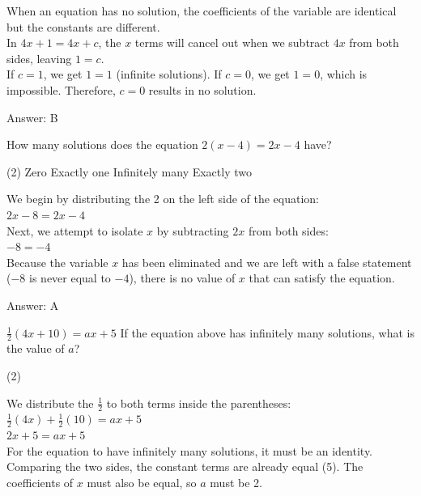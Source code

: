 \documentclass[11pt,paper=a4,answers]{exam}
\begin{document}
\begin{questions}
\begin{solution}
When an equation has no solution, the coefficients of the variable are identical but the constants are different. 
\\[10pt]
In $4x + 1 = 4x + c$, the $x$ terms will cancel out when we subtract $4x$ from both sides, leaving $1 = c$. 
\\[10pt]
If $c = 1$, we get $1 = 1$ (infinite solutions). If $c = 0$, we get $1 = 0$, which is impossible. Therefore, $c = 0$ results in no solution.

\vspace{20pt}
Answer: \colorbox{yellow!100}{B}
\end{solution}

\question
How many solutions does the equation $2(x - 4) = 2x - 4$ have?
\begin{tasks}(2)
    \task Zero
    \task Exactly one
    \task Infinitely many
    \task Exactly two
\end{tasks}

\begin{solution}
We begin by distributing the 2 on the left side of the equation:
\\[10pt]
$2x - 8 = 2x - 4$ 
\\[10pt]
Next, we attempt to isolate $x$ by subtracting $2x$ from both sides:
\\[10pt]
$-8 = -4$ 
\\[10pt]
Because the variable $x$ has been eliminated and we are left with a false statement ($-8$ is never equal to $-4$), there is no value of $x$ that can satisfy the equation.

\vspace{20pt}
Answer: \colorbox{yellow!100}{A}
\end{solution}

\question
$\frac{1}{2}(4x + 10) = ax + 5$
If the equation above has infinitely many solutions, what is the value of $a$?
\begin{tasks}(2)
\end{tasks}

\begin{solution}
We distribute the $\frac{1}{2}$ to both terms inside the parentheses:
\\[10pt]
$\frac{1}{2}(4x) + \frac{1}{2}(10) = ax + 5$ \\
$2x + 5 = ax + 5$ 
\\[10pt]
For the equation to have infinitely many solutions, it must be an identity. Comparing the two sides, the constant terms are already equal (5). The coefficients of $x$ must also be equal, so $a$ must be 2.


\end{solution}
\end{questions}
\end{document}
